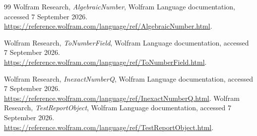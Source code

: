 \documentclass[11pt,a4paper]{article}
\theoremstyle{definition}
\begin{document}
\begin{thebibliography}{99}
Wolfram Research, \emph{AlgebraicNumber}, Wolfram Language documentation, accessed 7 September 2026.
\url{https://reference.wolfram.com/language/ref/AlgebraicNumber.html}.

Wolfram Research, \emph{ToNumberField}, Wolfram Language documentation, accessed 7 September 2026.
\url{https://reference.wolfram.com/language/ref/ToNumberField.html}.

Wolfram Research, \emph{InexactNumberQ}, Wolfram Language documentation, accessed 7 September 2026.
\url{https://reference.wolfram.com/language/ref/InexactNumberQ.html}.
Wolfram Research, \emph{TestReportObject}, Wolfram Language documentation, accessed 7 September 2026.
\url{https://reference.wolfram.com/language/ref/TestReportObject.html}.
\end{thebibliography}
\end{document}
